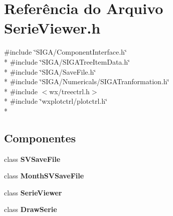 \section{Referência do Arquivo Serie\+Viewer.\+h}
\label{_serie_viewer_8h}
{\ttfamily \#include \char`\"{}S\+I\+G\+A/\+Component\+Interface.\+h\char`\"{}}\\*
{\ttfamily \#include \char`\"{}S\+I\+G\+A/\+S\+I\+G\+A\+Tree\+Item\+Data.\+h\char`\"{}}\\*
{\ttfamily \#include \char`\"{}S\+I\+G\+A/\+Save\+File.\+h\char`\"{}}\\*
{\ttfamily \#include \char`\"{}S\+I\+G\+A/\+Numericals/\+S\+I\+G\+A\+Tranformation.\+h\char`\"{}}\\*
{\ttfamily \#include $<$wx/treectrl.\+h$>$}\\*
{\ttfamily \#include \char`\"{}wxplotctrl/plotctrl.\+h\char`\"{}}\\*
\subsection*{Componentes}
\begin{DoxyCompactItemize}
\item 
class {\bf S\+V\+Save\+File}
\item 
class {\bf Month\+S\+V\+Save\+File}
\item 
class {\bf Serie\+Viewer}
\item 
class {\bf Draw\+Serie}
\end{DoxyCompactItemize}
